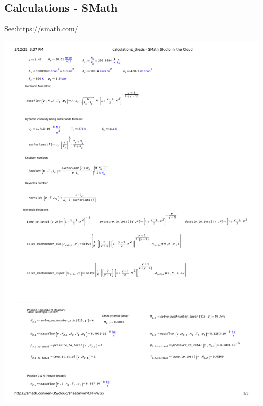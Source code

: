 \subsection{Calculations - SMath}
See:\quad \url{https://smath.com/}

\includegraphics[page=1, width=\textwidth]{code/smath.pdf}
\newpage
